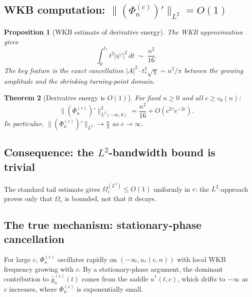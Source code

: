 \documentclass[12pt,a4paper]{amsart}
\newtheorem{theorem}{Theorem}[section]
\newtheorem{proposition}[theorem]{Proposition}
\theoremstyle{remark}
\begin{document}
\subsection{WKB computation: $\|(\Phi_n^{(c)})'\|_{L^2} = O(1)$}
\label{ssec:wkb-energy}

\begin{proposition}[WKB estimate of derivative energy]
\label{prop:wkb-energy}
The WKB approximation gives
\begin{equation}
\int_0^{t_*} t^2|\psi'|^2\,dt \;\sim\; \frac{n^2}{16}.
\end{equation}
The key feature is the exact cancellation $|A|^2 \cdot t_*^3\sqrt{\chi} \sim n^2/\pi$
between the growing amplitude and the shrinking turning-point domain.
\end{proposition}

\begin{theorem}[Derivative energy is $O(1)$]
\label{thm:deriv-energy-O1}
For fixed $n \ge 0$ and all $c \ge c_0(n)$:
\begin{equation}
\label{eq:deriv-energy-O1}
\|(\Phi_n^{(c)})'\|_{L^2(-\infty,0)}^2
= \frac{n^2}{16} + O\!\left(c^{2\gamma}e^{-2c}\right).
\end{equation}
In particular, $\|(\Phi_n^{(c)})'\|_{L^2} \to \frac{n}{4}$ as $c\to\infty$.
\end{theorem}

\subsection{Consequence: the $L^2$-bandwidth bound is trivial}

The standard tail estimate gives $\Omega_\varepsilon^{(L^2)} \le O(1)$ uniformly in $c$:
the $L^2$-approach proves only that $\Omega_\varepsilon$ is bounded, not that it decays.

\subsection{The true mechanism: stationary-phase cancellation}
\label{ssec:cancellation}

For large $c$, $\Phi_n^{(c)}$ oscillates rapidly on $(-\infty, u_*(c,n))$
with local WKB frequency growing with $c$.
By a stationary-phase argument, the dominant contribution to
$\widehat{g}_n^{(c)}(t)$ comes from the saddle $u^*(t,c)$, which drifts
to $-\infty$ as $c$ increases, where $\Phi_n^{(c)}$ is exponentially small.
\end{document}
